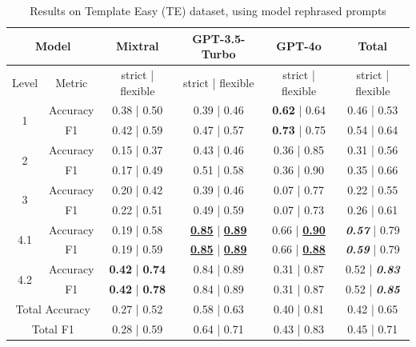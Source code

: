 \documentclass[runningheads]{llncs}
\begin{document}
\begin{table}[!bt]
\centering
\caption{Results on Template Easy (TE) dataset, using model rephrased prompts}
\begin{tabular}{cc|c|c|c|c}
\hline \hline
\multicolumn{2}{c|}{Model}  				& Mixtral & GPT-3.5-Turbo & GPT-4o & Total \\
\hline
Level & Metric                      & strict | flexible          & strict | flexible  & strict | flexible & strict | flexible      \\
\hline \hline
\multirow{2}{*}{1}     & Accuracy &	0.38 | 0.50 &	0.39 | 0.46 &	\textbf{0.62} | 0.64 & 0.46 | 0.53 \\
      & F1	     &  0.42 | 0.59 &	0.47 | 0.57	& \textbf{0.73} | 0.75 & 0.54 | 0.64\\
			\hline
\multirow{2}{*}{2}			& Accuracy &	0.15 | 0.37	& 0.43 | 0.46 &	0.36 | 0.85 & 0.31 | 0.56 \\
		  & F1	     &  0.17 | 0.49	& 0.51 | 0.58 &	0.36 | 0.90 & 0.35 | 0.66 \\
			\hline
\multirow{2}{*}{3}			& Accuracy & 0.20 | 0.42& 	0.39 | 0.46 &	0.07 | 0.77 & 0.22 | 0.55 \\
		  & F1	     &  0.22 | 0.51	& 0.49 | 0.59 &	0.07 | 0.73 & 0.26 | 0.61\\
			\hline
\multirow{2}{*}{4.1}   & Accuracy & 0.19 | 0.58 &	\underline{\textbf{0.85}} | \underline{\textbf{0.89}} &	0.66 | \underline{\textbf{0.90}} &  \textit{\textbf{0.57}} | 0.79 \\
		   & F1       &	0.19 | 0.59	& \underline{\textbf{0.85}} | \underline{\textbf{0.89}}	& 0.66 | \underline{\textbf{0.88}} & \textit{\textbf{0.59}} | 0.79 \\
			\hline
\multirow{2}{*}{4.2}   & Accuracy &	\textbf{0.42} | \textbf{0.74}	& 0.84 | 0.89	& 0.31 | 0.87 & 0.52 | \textit{\textbf{0.83}} \\
											 & F1       &	\textbf{0.42} | \textbf{0.78}	& 0.84 | 0.89	& 0.31 | 0.87 & 0.52 | \textit{\textbf{0.85}} \\
\hline \hline
\multicolumn{2}{c|}{Total Accuracy}	& 0.27 | 0.52	& 0.58 | 0.63	& 0.40 | 0.81 & 0.42 | 0.65 \\
\multicolumn{2}{c|}{Total F1}  	      & 0.28 | 0.59	& 0.64 | 0.71	& 0.43 | 0.83 & 0.45 | 0.71 \\
 \hline \hline
\end{tabular}
\label{tbl:TE-modelrephrased}
\end{table}
\end{document}
